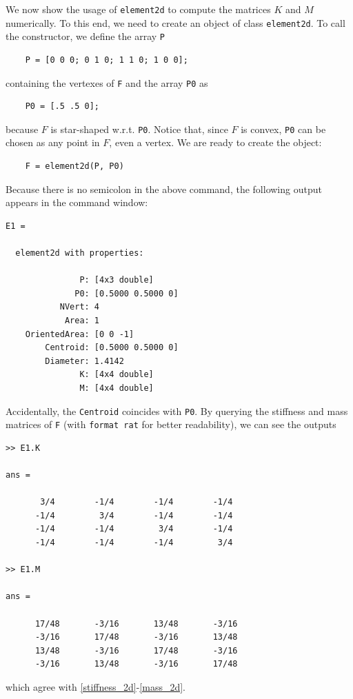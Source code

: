 \documentclass[a4paper]{article}
\begin{document}
\noindent
We now show the usage of \texttt{element2d} to compute the matrices $K$ and $M$ numerically. To this end, we need to create an object of class \texttt{element2d}. To call the constructor, we define the array \texttt{P}
\begin{lstlisting}
	P = [0 0 0; 0 1 0; 1 1 0; 1 0 0];
\end{lstlisting}
containing the vertexes of \texttt{F} and the array \texttt{P0} as
\begin{lstlisting}
	P0 = [.5 .5 0];
\end{lstlisting}
because $F$ is star-shaped w.r.t. \texttt{P0}. Notice that, since $F$ is convex,  \texttt{P0} can be chosen as any point in $F$, even a vertex. We are ready to create the object:
\begin{lstlisting}
	F = element2d(P, P0)
\end{lstlisting}
Because there is no semicolon in the above command, the following output appears in the command window:
\begin{lstlisting}
E1 = 

  element2d with properties:

               P: [4x3 double]
              P0: [0.5000 0.5000 0]
           NVert: 4
            Area: 1
    OrientedArea: [0 0 -1]
        Centroid: [0.5000 0.5000 0]
        Diameter: 1.4142
               K: [4x4 double]
               M: [4x4 double]
\end{lstlisting}

\noindent
Accidentally, the \texttt{Centroid} coincides with \texttt{P0}. By querying the stiffness and mass matrices of \texttt{F} (with \texttt{format rat} for better readability), we can see the outputs

\begin{lstlisting}
>> E1.K

ans =

       3/4        -1/4        -1/4        -1/4     
      -1/4         3/4        -1/4        -1/4     
      -1/4        -1/4         3/4        -1/4     
      -1/4        -1/4        -1/4         3/4     
      
>> E1.M

ans =

      17/48       -3/16       13/48       -3/16    
      -3/16       17/48       -3/16       13/48    
      13/48       -3/16       17/48       -3/16    
      -3/16       13/48       -3/16       17/48    
\end{lstlisting}

\noindent
which agree with \eqref{stiffness_2d}-\eqref{mass_2d}.
\end{document}
